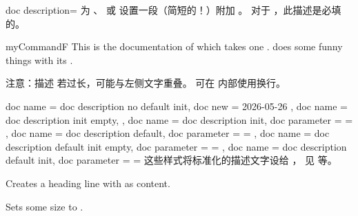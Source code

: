 \clearpage

\begin{docTcbKey}{doc description}{=}{\tcbdocdescInitEmpty}
  为 、 或 
  设置一段（简短的！）附加 。
  对于 ，此描述是必填的。
\begin{dispExample}
\begin{docCommand*}[doc description=my description]{myCommandF}{}
  This is the documentation of  which takes one .
   does some funny things with its .
\end{docCommand*}
\end{dispExample}
\begin{marker}
注意：描述  若过长，可能与左侧文字重叠。
可在  内部使用换行。
\end{marker}
\end{docTcbKey}

\begin{docTcbKeys}[doc description = 样式]
  {
    {
      doc name = doc description no default init,
      doc new  = 2026-05-26
    },
    {
      doc name = doc description init empty,
    },
    {
      doc name = doc description init,
      doc parameter = {=}
    },
    {
      doc name = doc description default,
      doc parameter = {=}
    },
    {
      doc name = doc description default init empty,
      doc parameter = {=}
    },
    {
      doc name = doc description default init,
      doc parameter = {=}
    }
  }
这些样式将标准化的描述文字设给 ，
见  等。

\begin{dispExample}
\begin{docKeys}[
    doc name              = /foo/footitle,
    doc parameter eq meta = text,
    doc description init empty
  ]{}
  Creates a heading line with  as content.
\end{docKeys}

\begin{docKeys}[
    doc name                     = /foo/foosize,
    doc parameter eq meta*       = length,
    doc description default init = {10cm}{3cm}
  ]{}
  Sets some size to .
\end{docKeys}
\end{dispExample}
\end{docTcbKeys}


